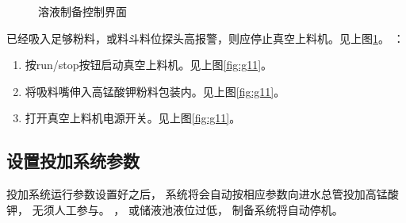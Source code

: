 \documentclass[UTF8,a4paper,12pt,titlepage]{ctexart}
\begin{document}
\begin{figure}[h]
            \caption{溶液制备控制界面}\label{fig:g12}
         \end{figure}

         \newpage

            已经吸入足够粉料，或料斗料位探头高报警，则应停止真空上料机。见上图\ref{fig:g12}。
         ：
         \begin{enumerate}
            \item 按run/stop按钮启动真空上料机。见上图\ref{fig:g11}。
            \item 将吸料嘴伸入高锰酸钾粉料包装内。见上图\ref{fig:g11}。
            \item 打开真空上料机电源开关。见上图\ref{fig:g11}。
         \end{enumerate}

   \subsection{设置投加系统参数}
        投加系统运行参数设置好之后，
        系统将会自动按相应参数向进水总管投加高锰酸钾，
        无须人工参与。
        ，
        或储液池液位过低，
        制备系统将自动停机。
\end{document}
